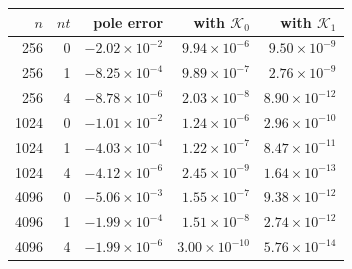 \begin{tabular}{@{}rrrrr@{}}
\toprule
$n$ & $nt$ & pole error & with $\mathcal K_0$ & with $\mathcal K_1$ \\
\midrule
256 & 0 & $-2.02\mathbin{\times}10^{-2}$ & $9.94\mathbin{\times}10^{-6}$ & $9.50\mathbin{\times}10^{-9}$ \\
256 & 1 & $-8.25\mathbin{\times}10^{-4}$ & $9.89\mathbin{\times}10^{-7}$ & $2.76\mathbin{\times}10^{-9}$ \\
256 & 4 & $-8.78\mathbin{\times}10^{-6}$ & $2.03\mathbin{\times}10^{-8}$ & $8.90\mathbin{\times}10^{-12}$ \\
1024 & 0 & $-1.01\mathbin{\times}10^{-2}$ & $1.24\mathbin{\times}10^{-6}$ & $2.96\mathbin{\times}10^{-10}$ \\
1024 & 1 & $-4.03\mathbin{\times}10^{-4}$ & $1.22\mathbin{\times}10^{-7}$ & $8.47\mathbin{\times}10^{-11}$ \\
1024 & 4 & $-4.12\mathbin{\times}10^{-6}$ & $2.45\mathbin{\times}10^{-9}$ & $1.64\mathbin{\times}10^{-13}$ \\
4096 & 0 & $-5.06\mathbin{\times}10^{-3}$ & $1.55\mathbin{\times}10^{-7}$ & $9.38\mathbin{\times}10^{-12}$ \\
4096 & 1 & $-1.99\mathbin{\times}10^{-4}$ & $1.51\mathbin{\times}10^{-8}$ & $2.74\mathbin{\times}10^{-12}$ \\
4096 & 4 & $-1.99\mathbin{\times}10^{-6}$ & $3.00\mathbin{\times}10^{-10}$ & $5.76\mathbin{\times}10^{-14}$ \\
\bottomrule
\end{tabular}
